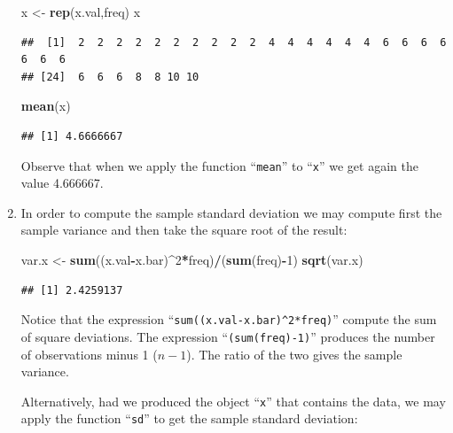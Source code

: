 \documentclass[]{krantz}
\makeatletter
\newenvironment{Shaded}{\begin{snugshade}}{\end{snugshade}}
\newcommand{\DecValTok}[1]{\textcolor[rgb]{0.00,0.00,0.81}{#1}}
\newcommand{\KeywordTok}[1]{\textcolor[rgb]{0.13,0.29,0.53}{\textbf{#1}}}
\newcommand{\NormalTok}[1]{#1}
\newcommand{\OperatorTok}[1]{\textcolor[rgb]{0.81,0.36,0.00}{\textbf{#1}}}
\newcommand{\StringTok}[1]{\textcolor[rgb]{0.31,0.60,0.02}{#1}}
\newenvironment{kframe}{%
\medskip{}
\setlength{\fboxsep}{.8em}
 \def\at@end@of@kframe{}%
 \ifinner\ifhmode%
  \def\at@end@of@kframe{\end{minipage}}%
  \begin{minipage}{\columnwidth}%
 \fi\fi%
 \def\FrameCommand##1{\hskip\@totalleftmargin \hskip-\fboxsep
 \colorbox{shadecolor}{##1}\hskip-\fboxsep
     \hskip-\linewidth \hskip-\@totalleftmargin \hskip\columnwidth}%
 \MakeFramed {\advance\hsize-\width
   \@totalleftmargin\z@ \linewidth\hsize
   \@setminipage}}%
 {\par\unskip\endMakeFramed%
 \at@end@of@kframe}
\renewenvironment{Shaded}{\begin{kframe}}{\end{kframe}}
\theoremstyle{definition}
\theoremstyle{definition}
\theoremstyle{definition}
\theoremstyle{remark}
\makeatother
\begin{document}
\begin{enumerate}
\begin{Shaded}
\begin{Highlighting}[]
\NormalTok{x <-}\StringTok{ }\KeywordTok{rep}\NormalTok{(x.val,freq)}
\NormalTok{x}
\end{Highlighting}
\end{Shaded}

\begin{verbatim}
##  [1]  2  2  2  2  2  2  2  2  2  2  4  4  4  4  4  4  6  6  6  6  6  6  6
## [24]  6  6  6  8  8 10 10
\end{verbatim}

\begin{Shaded}
\begin{Highlighting}[]
\KeywordTok{mean}\NormalTok{(x)}
\end{Highlighting}
\end{Shaded}

\begin{verbatim}
## [1] 4.6666667
\end{verbatim}

  Observe that when we apply the function ``\texttt{mean}'' to ``\texttt{x}'' we get again
  the value 4.666667.
\item
  In order to compute the
  sample standard deviation we may compute first the sample variance and
  then take the square root of the result:

\begin{Shaded}
\begin{Highlighting}[]
\NormalTok{var.x <-}\StringTok{ }\KeywordTok{sum}\NormalTok{((x.val}\OperatorTok{-}\NormalTok{x.bar)}\OperatorTok{^}\DecValTok{2}\OperatorTok{*}\NormalTok{freq)}\OperatorTok{/}\NormalTok{(}\KeywordTok{sum}\NormalTok{(freq)}\OperatorTok{-}\DecValTok{1}\NormalTok{)}
\KeywordTok{sqrt}\NormalTok{(var.x)}
\end{Highlighting}
\end{Shaded}

\begin{verbatim}
## [1] 2.4259137
\end{verbatim}

  Notice that the expression ``\texttt{sum((x.val-x.bar)\^{}2*freq)}'' compute the sum
  of square deviations. The expression ``\texttt{(sum(freq)-1)}'' produces the
  number of observations minus 1 (\(n-1\)). The ratio of the two gives the
  sample variance.

  Alternatively, had we produced the object ``\texttt{x}'' that contains the data,
  we may apply the function ``\texttt{sd}'' to get the sample standard deviation:


\end{enumerate}
\end{document}
